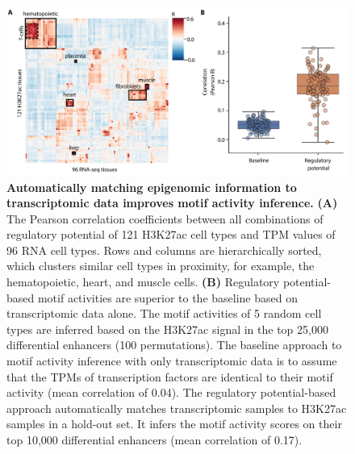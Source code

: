 \begin{figure}
    \centering
    \includegraphics[width=1.0\linewidth]{ch.scepia/imgs/CellTypes_MvS_Myriad_removeGreenBox1_centered_Figure1.png}
    \caption{\textbf{Automatically matching epigenomic information to transcriptomic data improves motif activity inference.} \textbf{(A)} The Pearson correlation coefficients between all combinations of regulatory potential of 121 H3K27ac cell types and TPM values of 96 RNA cell types. Rows and columns are hierarchically sorted, which clusters similar cell types in proximity, for example, the hematopoietic, heart, and muscle cells. \textbf{(B)} Regulatory potential-based motif activities are superior to the baseline based on transcriptomic data alone. The motif activities of 5 random cell types are inferred based on the H3K27ac signal in the top 25,000 differential enhancers (100 permutations). The baseline approach to motif activity inference with only transcriptomic data is to assume that the TPMs of transcription factors are identical to their motif activity (mean correlation of 0.04). The regulatory potential-based approach automatically matches transcriptomic samples to H3K27ac samples in a hold-out set. It infers the motif activity scores on their top 10,000 differential enhancers (mean correlation of 0.17).}
    \label{fig:bulk_comparison}
\end{figure}

